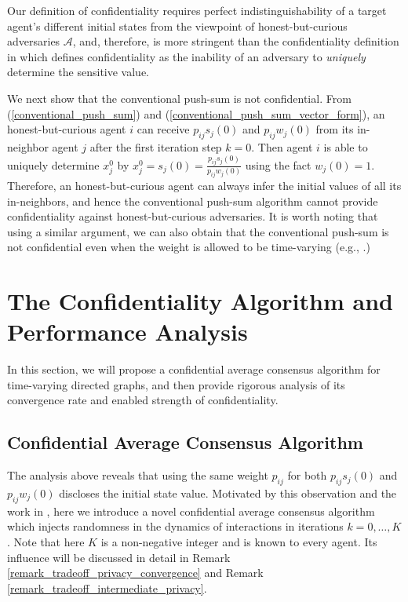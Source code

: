 \documentclass{IEEEtran}
\begin{document}
Our definition of confidentiality requires perfect indistinguishability of a target agent's different initial states from the viewpoint of honest-but-curious adversaries $\mathcal{A}$, and, therefore, is more stringent than the confidentiality definition in \cite{manitara2013privacy, duan2015privacy, liu2006random, han2010privacy, cao2014privacy} which defines confidentiality as the inability of an adversary to {\it uniquely} determine the sensitive value.

We next show that the conventional push-sum is not confidential. From (\ref{conventional_push_sum}) and (\ref{conventional_push_sum_vector_form}), an honest-but-curious agent $i$ can receive $p_{ij}s_j(0)$ and $p_{ij}w_j(0)$ from its in-neighbor agent $j$ after the first iteration step $k=0$. Then agent $i$ is able to uniquely determine $x_j^0$ by $x_j^0 =s_j(0) = \frac{p_{ij}s_j(0)} {p_{ij}w_j(0)}$ using the fact $w_j(0)=1$. Therefore, an honest-but-curious agent can always infer the initial values of all its in-neighbors, and hence the conventional push-sum algorithm cannot provide confidentiality against honest-but-curious adversaries. It is worth noting that using a similar argument, we can also obtain that the conventional push-sum is not confidential even when the weight is allowed to be time-varying (e.g., \cite{benezit2010weighted}.)

\section{The Confidentiality Algorithm and Performance Analysis}

In this section, we will propose a confidential average consensus algorithm for time-varying directed graphs, and then provide rigorous analysis of its convergence rate and enabled strength of confidentiality.

\subsection{Confidential Average Consensus Algorithm}

The analysis above reveals that using the same weight $p_{ij}$ for both $p_{ij}s_j(0)$ and $p_{ij}w_j(0)$ discloses the initial state value. Motivated by this observation and the work in \cite{gupta2019statistical}, here we introduce a novel confidential average consensus algorithm which injects randomness in the dynamics of interactions in iterations $k=0, \ldots, K$. Note that here $K$ is a non-negative integer and is known to every agent. Its influence will be discussed in detail in Remark \ref{remark_tradeoff_privacy_convergence} and Remark \ref{remark_tradeoff_intermediate_privacy}.
\end{document}
